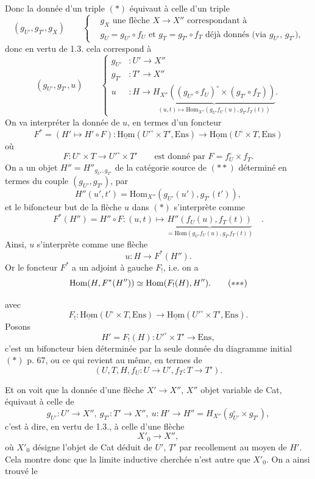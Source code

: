 \documentclass[11pt]{article}
\newcommand{\printedpage}[1]{\marginpar{\footnotesize p.~#1}}
\newcommand{\msp}[1]{\marginpar{\footnotesize [#1]}}
\newcommand{\Hom}{\mathrm{Hom}}
\newcommand{\uHom}{\underline{\mathrm{Hom}}}
\newcommand{\Ens}{\mathrm{Ens}}
\begin{document}
\msp{page 68} Donc la donnée d'un triple $(*)$ équivaut à celle d'un triple
\[
(g_{U'}, g_{T'}, g_X) \qquad
\left\{\begin{aligned}
&g_X \text{ une flèche } X\longrightarrow X'' \text{ correspondant à}\\
&g_U = g_{U'}\circ f_U \text{ et } g_T = g_{T'}\circ f_T \text{ déjà donnés (via } g_{U'}\text{, } g_{T'}\text{),}
\end{aligned}\right.
\]
donc en vertu de 1.3. cela correspond à
\[
(g_{U'}, g_{T'}, u) \qquad
\left\{\begin{aligned}
g_{U'} &: U' \longrightarrow X''\\
g_{T'} &: T' \longrightarrow X''\\
u &: H \longrightarrow \underbrace{H_{X''}\left((g_{U'}\circ f_U)^{\circ}\times(g_{T'}\circ f_T)\right)}_{(u,t)\longmapsto \Hom_{X''}(g_{U'}f_U(u),g_{T'}f_T(t))}.
\end{aligned}\right.
\tag*{$(*)$}
\]
On va interpréter la donnée de $u$, en termes d'un foncteur
\[
F^{*} = (H'\longmapsto H'\circ F) : \uHom(U'^{\circ}\times T',\Ens) \longrightarrow \uHom(U^{\circ}\times T,\Ens)
\tag*{$(**)$}
\]
où
\[
F : U^{\circ}\times T \longrightarrow U'^{\circ}\times T' \qquad \text{est donné par } F = f_U^{\circ}\times f_T.
\]
On a un objet $H''=H''_{g_{U'},g_{T'}}$ de la catégorie source de $(**)$ déterminé en termes du couple $(g_{U'},g_{T'})$, par
\[
H''(u',t') = \Hom_{X''}(g_{U'}(u'),g_{T'}(t')),
\]
et le bifoncteur but de la flèche $u$ dans $(*)$ s'interprète comme
\[
F^{*}(H'') = H''\circ F : (u,t)\longmapsto \underbrace{H''(f_U(u),f_T(t))}_{=\Hom(g_{U'}f_U(u),g_{T'}f_T(t))} \quad .
\]
Ainsi, $u$ s'interprète comme une flèche
\[
u : H \longrightarrow F^{*}(H'').
\]
Or le foncteur $F^{*}$ a un adjoint à gauche $F_{!}$, i.e. on a
\[
\Hom(H,F^{*}(H'')) \simeq \Hom(F_{!}(H),H'').
\tag*{$(*{*}*)$}
\]

\printedpage{50}
\msp{page 69} avec
\[
F_{!} : \uHom(U^{\circ}\times T,\Ens) \longrightarrow \uHom(U'^{\circ}\times T',\Ens).
\]
Posons
\[
H' = F_{!}(H) : U'^{\circ}\times T' \longrightarrow \Ens,
\]
c'est un bifoncteur bien déterminée par la seule donnée du diagramme initial $(*)$ p. 67, ou ce qui revient au même, en termes de %
\[
(U,T,H,f_U : U\longrightarrow U', f_T : T\longrightarrow T').
\]

Et on voit que la donnée d'une flèche $X'\longrightarrow X''$, $X''$ objet variable de Cat, équivaut à celle de
\[
g_{U'} : U'\longrightarrow X'',\ g_{T'} : T'\longrightarrow X'',\ u : H'\longrightarrow H'' = H_{X''}(g_{U'}^{\circ}\times g_{T'}),
\]
c'est à dire, en vertu de 1.3., à celle d'une flèche
\[
X'_0 \longrightarrow X'',
\]
où $X'_0$ désigne l'objet de Cat déduit de $U'$, $T'$ par recollement au moyen de $H'$. Cela montre donc que la limite inductive cherchée n'est autre que $X'_0$. On a ainsi trouvé le
\end{document}
